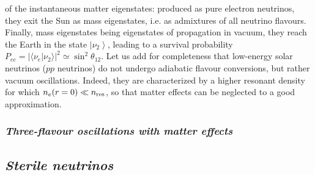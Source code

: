of the instantaneous matter eigenstates: produced as pure electron neutrinos,
they exit the Sun as mass eigenstates, i.e. as admixtures of all neutrino flavours.
Finally, mass eigenstates being eigenstates of propagation in vacuum, they reach
the Earth in the state $\left|\nu_2 \right>$, leading to a survival probability
$P_{ee} = | \langle \nu_e | \nu_2 \rangle |^2 \simeq \sin^2 \theta_{12}$.
Let us add for completeness that low-energy solar neutrinos ($pp$ neutrinos) do not undergo
adiabatic flavour conversions, but rather vacuum oscillations. Indeed, they
are characterized by a higher resonant density for which $n_e(r=0) \ll n_{\rm res}$,
so that matter effects %
can be neglected to a good approximation.


\subsubsection{\it Three-flavour oscillations with matter effects   %
\label{subsec:matter_3f}}                                                              %





\subsection{\it Sterile neutrinos     %
\label{subsec:steriles}}                  %

